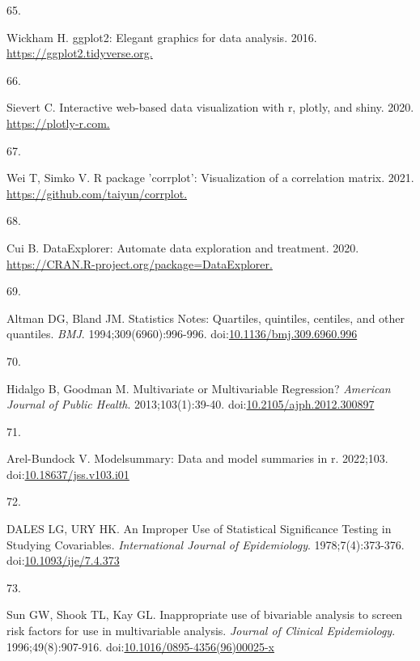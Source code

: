 \documentclass[
]{book}
\newlength{\cslhangindent}
\newlength{\csllabelwidth}
\newlength{\cslentryspacingunit} %
\newenvironment{CSLReferences}[2] %
 {%
  \setlength{\parindent}{0pt}
  \ifodd #1
  \let\oldpar\par
  \def\par{\hangindent=\cslhangindent\oldpar}
  \fi
  \setlength{\parskip}{#2\cslentryspacingunit}
 }%
 {}
\newcommand{\CSLLeftMargin}[1]{\parbox[t]{\csllabelwidth}{#1}}
\newcommand{\CSLRightInline}[1]{\parbox[t]{\linewidth - \csllabelwidth}{#1}\break}
\begin{document}
\begin{CSLReferences}{0}{0}
\leavevmode{}%
\CSLLeftMargin{65. }%
\CSLRightInline{Wickham H. ggplot2: Elegant graphics for data analysis. 2016. \href{https://ggplot2.tidyverse.org}{https://ggplot2.tidyverse.org.}}

\leavevmode{}%
\CSLLeftMargin{66. }%
\CSLRightInline{Sievert C. Interactive web-based data visualization with r, plotly, and shiny. 2020. \href{https://plotly-r.com}{https://plotly-r.com.}}

\leavevmode{}%
\CSLLeftMargin{67. }%
\CSLRightInline{Wei T, Simko V. R package 'corrplot': Visualization of a correlation matrix. 2021. \href{https://github.com/taiyun/corrplot}{https://github.com/taiyun/corrplot.}}

\leavevmode{}%
\CSLLeftMargin{68. }%
\CSLRightInline{Cui B. DataExplorer: Automate data exploration and treatment. 2020. \href{https://CRAN.R-project.org/package=DataExplorer}{https://CRAN.R-project.org/package=DataExplorer.}}

\leavevmode{}%
\CSLLeftMargin{69. }%
\CSLRightInline{Altman DG, Bland JM. Statistics Notes: Quartiles, quintiles, centiles, and other quantiles. \emph{BMJ}. 1994;309(6960):996-996. doi:\href{https://doi.org/10.1136/bmj.309.6960.996}{10.1136/bmj.309.6960.996}}

\leavevmode{}%
\CSLLeftMargin{70. }%
\CSLRightInline{Hidalgo B, Goodman M. Multivariate or Multivariable Regression? \emph{American Journal of Public Health}. 2013;103(1):39-40. doi:\href{https://doi.org/10.2105/ajph.2012.300897}{10.2105/ajph.2012.300897}}

\leavevmode{}%
\CSLLeftMargin{71. }%
\CSLRightInline{Arel-Bundock V. {\textbraceleft}Modelsummary{\textbraceright}: Data and model summaries in {\textbraceleft}r{\textbraceright}. 2022;103. doi:\href{https://doi.org/10.18637/jss.v103.i01}{10.18637/jss.v103.i01}}

\leavevmode{}%
\CSLLeftMargin{72. }%
\CSLRightInline{DALES LG, URY HK. An Improper Use of Statistical Significance Testing in Studying Covariables. \emph{International Journal of Epidemiology}. 1978;7(4):373-376. doi:\href{https://doi.org/10.1093/ije/7.4.373}{10.1093/ije/7.4.373}}

\leavevmode{}%
\CSLLeftMargin{73. }%
\CSLRightInline{Sun GW, Shook TL, Kay GL. Inappropriate use of bivariable analysis to screen risk factors for use in multivariable analysis. \emph{Journal of Clinical Epidemiology}. 1996;49(8):907-916. doi:\href{https://doi.org/10.1016/0895-4356(96)00025-x}{10.1016/0895-4356(96)00025-x}}


\end{CSLReferences}
\end{document}
